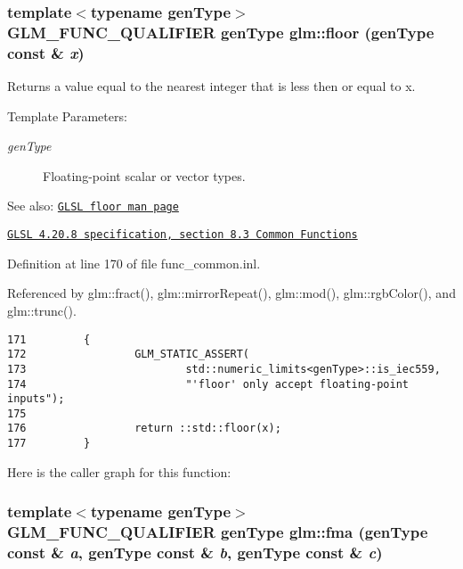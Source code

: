 \hypertarget{group__core__func__common_gf87c2d5cbed8b293dcb7506b7c06c9e1}{
\subsubsection[floor]{\setlength{\rightskip}{0pt plus 5cm}template$<$typename genType$>$ GLM\_\-FUNC\_\-QUALIFIER genType glm::floor (genType const \& {\em x})}}
\label{group__core__func__common_gf87c2d5cbed8b293dcb7506b7c06c9e1}


Returns a value equal to the nearest integer that is less then or equal to x.

\begin{Desc}
\item[Template Parameters:]
\begin{description}
\item[{\em genType}]Floating-point scalar or vector types.\end{description}
\end{Desc}
\begin{Desc}
\item[See also:]\href{http://www.opengl.org/sdk/docs/manglsl/xhtml/floor.xml}{\tt GLSL floor man page} 

\href{http://www.opengl.org/registry/doc/GLSLangSpec.4.20.8.pdf}{\tt GLSL 4.20.8 specification, section 8.3 Common Functions} \end{Desc}


Definition at line 170 of file func\_\-common.inl.

Referenced by glm::fract(), glm::mirrorRepeat(), glm::mod(), glm::rgbColor(), and glm::trunc().

\begin{Code}\begin{verbatim}171         {
172                 GLM_STATIC_ASSERT(
173                         std::numeric_limits<genType>::is_iec559,
174                         "'floor' only accept floating-point inputs");
175 
176                 return ::std::floor(x);
177         }
\end{verbatim}
\end{Code}




Here is the caller graph for this function:\hypertarget{group__core__func__common_ga9d229fca69599e027dd6a097938367b}{
\subsubsection[fma]{\setlength{\rightskip}{0pt plus 5cm}template$<$typename genType$>$ GLM\_\-FUNC\_\-QUALIFIER genType glm::fma (genType const \& {\em a}, \/  genType const \& {\em b}, \/  genType const \& {\em c})}}
\label{group__core__func__common_ga9d229fca69599e027dd6a097938367b}


